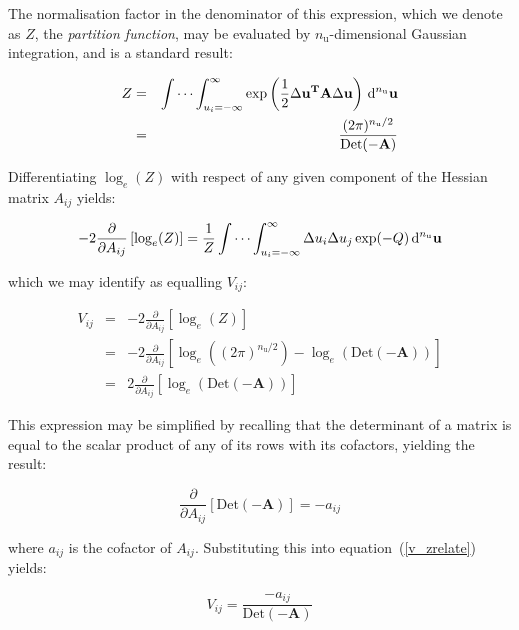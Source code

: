 \documentclass[a4paper,onecolumn,11pt]{book}
\begin{document}
The normalisation factor in the denominator of this expression, which we denote
as $Z$, the \textit{partition function}, may be evaluated by
$n_\mathrm{u}$-dimensional Gaussian integration, and is a standard result:

\begin{eqnarray}
Z & = & \idotsint_{u_i=-\infty}^{\infty} \exp\left(\frac{1}{2} \Delta \mathbf{u}^\mathbf{T} \mathbf{A} \Delta \mathbf{u} \right) \,\mathrm{d}^{n_\mathrm{u}}\mathbf{u} \\
& = & \frac{(2\pi)^{n_\mathrm{u}/2}}{\mathrm{Det}(\mathbf{-A})} \nonumber
\end{eqnarray}

Differentiating $\log_e(Z)$ with respect of any given component of the Hessian
matrix $A_{ij}$ yields:

\begin{equation}
-2 \frac{\partial}{\partial A_{ij}} \left[ \log_e(Z) \right] = \frac{1}{Z}
\idotsint_{u_i=-\infty}^{\infty} \Delta u_i \Delta u_j \exp(-Q) \,\mathrm{d}^{n_\mathrm{u}}\mathbf{u}
\end{equation}

\noindent which we may identify as equalling $V_{ij}$:

\begin{eqnarray}
\label{v_zrelate}
V_{ij} & = & -2 \frac{\partial}{\partial A_{ij}} \left[ \log_e(Z) \right] \\
& = & -2 \frac{\partial}{\partial A_{ij}} \left[ \log_e((2\pi)^{n_\mathrm{u}/2}) - \log_e(\mathrm{Det}(\mathbf{-A})) \right] \nonumber \\
& = & 2 \frac{\partial}{\partial A_{ij}} \left[ \log_e(\mathrm{Det}(\mathbf{-A})) \right] \nonumber
\end{eqnarray}

\noindent This expression may be simplified by recalling that the determinant
of a matrix is equal to the scalar product of any of its rows with its
cofactors, yielding the result:

\begin{equation}
\frac{\partial}{\partial A_{ij}} \left[\mathrm{Det}(\mathbf{-A})\right] = -a_{ij}
\end{equation}

\noindent where $a_{ij}$ is the cofactor of $A_{ij}$. Substituting this into
equation~(\ref{v_zrelate}) yields:

\begin{equation}
V_{ij} = \frac{-a_{ij}}{\mathrm{Det}(\mathbf{-A})}
\end{equation}
\end{document}
